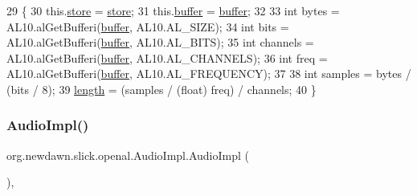 \begin{DoxyCode}
29                                             \{
30         this.\mbox{\hyperlink{classorg_1_1newdawn_1_1slick_1_1openal_1_1_audio_impl_a1f616264ac2d6ec44cb0c187836d34f5}{store}} = \mbox{\hyperlink{classorg_1_1newdawn_1_1slick_1_1openal_1_1_audio_impl_a1f616264ac2d6ec44cb0c187836d34f5}{store}};
31         this.\mbox{\hyperlink{classorg_1_1newdawn_1_1slick_1_1openal_1_1_audio_impl_ac08b49601da30895fecfdca4e8ba0049}{buffer}} = \mbox{\hyperlink{classorg_1_1newdawn_1_1slick_1_1openal_1_1_audio_impl_ac08b49601da30895fecfdca4e8ba0049}{buffer}};
32         
33         \textcolor{keywordtype}{int} bytes = AL10.alGetBufferi(\mbox{\hyperlink{classorg_1_1newdawn_1_1slick_1_1openal_1_1_audio_impl_ac08b49601da30895fecfdca4e8ba0049}{buffer}}, AL10.AL\_SIZE);
34         \textcolor{keywordtype}{int} bits = AL10.alGetBufferi(\mbox{\hyperlink{classorg_1_1newdawn_1_1slick_1_1openal_1_1_audio_impl_ac08b49601da30895fecfdca4e8ba0049}{buffer}}, AL10.AL\_BITS);
35         \textcolor{keywordtype}{int} channels = AL10.alGetBufferi(\mbox{\hyperlink{classorg_1_1newdawn_1_1slick_1_1openal_1_1_audio_impl_ac08b49601da30895fecfdca4e8ba0049}{buffer}}, AL10.AL\_CHANNELS);
36         \textcolor{keywordtype}{int} freq = AL10.alGetBufferi(\mbox{\hyperlink{classorg_1_1newdawn_1_1slick_1_1openal_1_1_audio_impl_ac08b49601da30895fecfdca4e8ba0049}{buffer}}, AL10.AL\_FREQUENCY);
37         
38         \textcolor{keywordtype}{int} samples = bytes / (bits / 8);
39         \mbox{\hyperlink{classorg_1_1newdawn_1_1slick_1_1openal_1_1_audio_impl_a7628a9de4830c72d626c640fa6a77afe}{length}} = (samples / (float) freq) / channels;
40     \}
\end{DoxyCode}
\mbox{\label{classorg_1_1newdawn_1_1slick_1_1openal_1_1_audio_impl_aa399c5a8b45ad4057febd4ff026f6458}} 
\subsubsection{\texorpdfstring{Audio\+Impl()}{AudioImpl()}\hspace{0.1cm}{\footnotesize\ttfamily [2/2]}}
{\footnotesize\ttfamily org.\+newdawn.\+slick.\+openal.\+Audio\+Impl.\+Audio\+Impl (\begin{DoxyParamCaption}{ }\end{DoxyParamCaption})\hspace{0.3cm}{\ttfamily [inline]}, {\ttfamily [protected]}}


